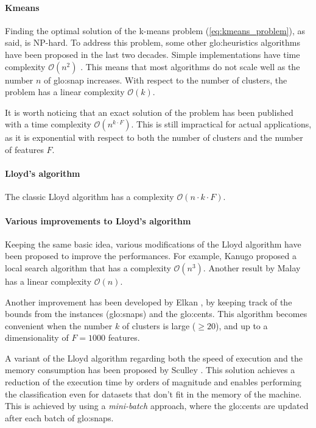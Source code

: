 \paragraph*{Kmeans}
Finding the optimal solution of the k-means problem (\autoref{eq:kmeans_problem}), as said, is NP-hard.
To address this problem, some other {\gls{glo:heuristic}}s algorithms have been proposed in the last two decades. Simple implementations have time complexity $\mathcal{O}(n^2)$ \cite{Kmeans_linear}.  This means that most algorithms do not scale well as the number $n$ of {\gls{glo:snap}} increases. With respect to the number of clusters, the problem has a linear complexity $\mathcal{O}(k)$.

It is worth noticing that an exact solution of the problem has been published \cite{Kmeans_vornoi_japan} with a time complexity $\mathcal{O}(n^{k\cdot F})$. This is still impractical for actual applications, as it is exponential with respect to both the number of clusters and the number of features $F$.

\paragraph*{Lloyd's algorithm}
The classic Lloyd algorithm \cite{Lloyd1982} has a complexity $\mathcal{O}(n\cdot k\cdot F )$.

\paragraph*{Various improvements to Lloyd's algorithm} Keeping the same basic idea, various modifications of the Lloyd algorithm have been proposed to improve the performances. For example, Kanugo \cite{kanungo2004local} proposed a local search algorithm that has a complexity $\mathcal{O}(n^3)$. Another result by Malay \cite{Kmeans_linear} has a linear complexity $\mathcal{O}(n)$. 

Another improvement has been developed by Elkan \cite{kmeans-accelerated}, by keeping track of the bounds from the instances ({\gls{glo:snap}}s) and the {\gls{glo:cent}}s. This algorithm becomes convenient when the number $k$ of clusters is large ($\geq 20$), and up to a dimensionality of $F=1000$ features.

A variant of the Lloyd algorithm regarding both the speed of execution and the memory consumption has been proposed by Sculley \cite{Sculley2010}. This solution achieves a reduction of the execution time by orders of magnitude and enables performing the classification even for datasets that don't fit in the memory of the machine. This is achieved by using a \emph{mini-batch} approach, where the {\gls{glo:cent}}s are updated after each batch of {\gls{glo:snap}}s.

